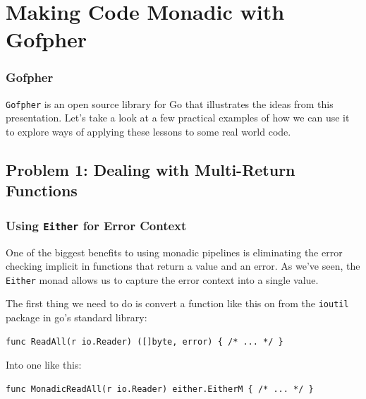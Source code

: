 \documentclass{beamer}
\begin{document}
\section{Making Code Monadic with Gofpher}

\begin{frame}
  \frametitle{Gofpher}
  {\tt Gofpher} is an open source library for Go that illustrates the
  ideas from this presentation.  Let's take a look at a few practical
  examples of how we can use it to explore ways of applying these
  lessons to some real world code.
\end{frame}

\subsection{Problem 1: Dealing with Multi-Return Functions}

\begin{frame}[fragile]
  \frametitle{Using {\tt Either} for Error Context}
  One of the biggest benefits to using monadic pipelines is
  eliminating the error checking implicit in functions that return a
  value and an error.  As we've seen, the {\tt Either} monad allows us
  to capture the error context into a single value.
  \par\pause
  The first thing we need to do is convert a function like this on
  from the {\tt ioutil} package in go's standard library:
\begin{lstlisting}[language=Golang]
func ReadAll(r io.Reader) ([]byte, error) { /* ... */ }
\end{lstlisting}
  \par\pause
  Into one like this:
\begin{lstlisting}[language=Golang]
func MonadicReadAll(r io.Reader) either.EitherM { /* ... */ }
\end{lstlisting}
\end{frame}
\end{document}
